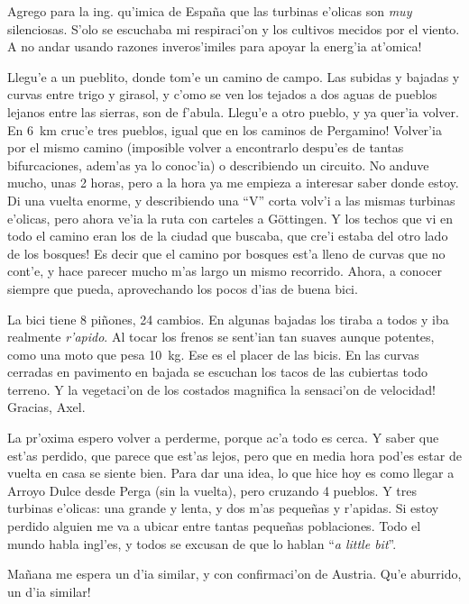 Agrego para la ing. qu'imica de Espa\~na que las turbinas e'olicas son
\emph{muy} silenciosas. S'olo se escuchaba mi respiraci'on y los cultivos
mecidos por el viento. \textexclamdown A no andar usando razones inveros'imiles
para apoyar la energ'ia at'omica!

Llegu'e a un pueblito, donde tom'e un camino de campo. Las subidas y bajadas y
curvas entre trigo y girasol, y c'omo se ven los tejados a dos aguas de pueblos
lejanos entre las sierras, son de f'abula. Llegu'e a otro pueblo, y ya quer'ia
volver. En 6~km cruc'e tres pueblos, \textexclamdown igual que en los caminos de
Pergamino! Volver'ia por el mismo camino (imposible volver a encontrarlo
despu'es de tantas bifurcaciones, adem'as ya lo conoc'ia) o describiendo un
circuito. No anduve mucho, unas 2 horas, pero a la hora ya me empieza a
interesar saber donde estoy. Di una vuelta enorme, y describiendo una ``V''
corta volv'i a las mismas turbinas e'olicas, pero ahora ve'ia la ruta con
carteles a G\"ottingen. \textexclamdown Y los techos que vi en todo el camino
eran los de la ciudad que buscaba, que cre'i estaba del otro lado de los
bosques! Es decir que el camino por bosques est'a lleno de curvas que no cont'e,
y hace parecer mucho m'as largo un mismo recorrido. Ahora, a conocer siempre que
pueda, aprovechando los pocos d'ias de buena bici.

La bici tiene 8 pi\~nones, 24 cambios. En algunas bajadas los tiraba a todos y
iba realmente \emph{r'apido}. Al tocar los frenos se sent'ian tan suaves aunque
potentes, como una moto que pesa 10~kg. Ese es el placer de las bicis. En
las curvas cerradas en pavimento en bajada se escuchan los tacos de las
cubiertas todo terreno. \textexclamdown Y la vegetaci'on de los costados
magnifica la sensaci'on de velocidad! Gracias, Axel.

La pr'oxima espero volver a perderme, porque ac'a todo es cerca. Y saber que
est'as perdido, que parece que est'as lejos, pero que en media hora pod'es estar
de vuelta en casa se siente bien. Para dar una idea, lo que hice hoy es como
llegar a Arroyo Dulce desde Perga (sin la vuelta), pero cruzando 4 pueblos. Y
tres turbinas e'olicas: una grande y lenta, y dos m'as peque\~nas y r'apidas. Si
estoy perdido alguien me va a ubicar entre tantas peque\~nas poblaciones. Todo
el mundo habla ingl'es, y todos se excusan de que lo hablan ``\emph{a little
bit}''.

Ma\~nana me espera un d'ia similar, y con confirmaci'on de Austria.
\textexclamdown Qu'e aburrido, un d'ia similar!

